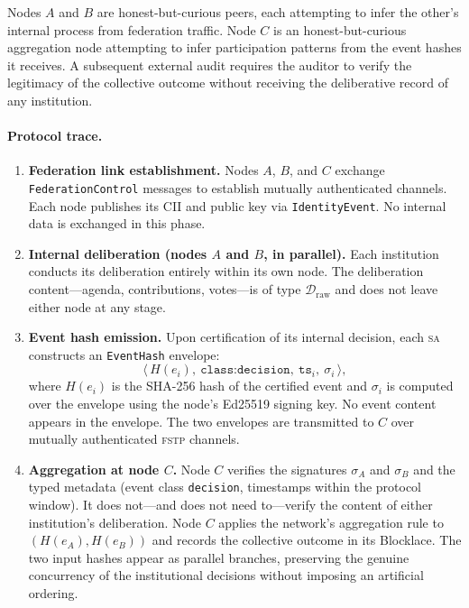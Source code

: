 \documentclass[12pt]{article}
\newcommand{\Draw}{\mathcal{D}_{\text{raw}}}
\newcommand{\SA}{\textsc{sa}}
\newcommand{\FSTP}{\textsc{fstp}}
\begin{document}
	Nodes $A$ and $B$ are honest-but-curious peers, each attempting to
	infer the other's internal process from federation traffic. Node $C$
	is an honest-but-curious aggregation node attempting to infer
	participation patterns from the event hashes it receives. A subsequent
	external audit requires the auditor to verify the legitimacy of the
	collective outcome without receiving the deliberative record of any
	institution.
	
	\paragraph{Protocol trace.}
	
	\begin{enumerate}[itemsep=3pt,topsep=4pt]
		
		\item \textbf{Federation link establishment.} Nodes $A$, $B$, and
		$C$ exchange \texttt{FederationControl} messages to establish
		mutually authenticated channels. Each node publishes its CII and
		public key via \texttt{IdentityEvent}. No internal data is
		exchanged in this phase.
		
		\item \textbf{Internal deliberation (nodes $A$ and $B$, in parallel).}
		Each institution conducts its deliberation entirely within its own
		node. The deliberation content---agenda, contributions, votes---is
		of type $\Draw$ and does not leave either node at any stage.
		
		\item \textbf{Event hash emission.} Upon certification of its
		internal decision, each \SA{} constructs an \texttt{EventHash}
		envelope:
		\[
		\langle\, H(e_i),\ \texttt{class:decision},\
		\texttt{ts}_i,\ \sigma_i \,\rangle,
		\]
		where $H(e_i)$ is the SHA-256 hash of the certified event and
		$\sigma_i$ is computed over the envelope using the node's Ed25519
		signing key. No event content appears in the envelope. The two
		envelopes are transmitted to $C$ over mutually authenticated
		\FSTP{} channels.
		
		\item \textbf{Aggregation at node $C$.} Node $C$ verifies the
		signatures $\sigma_A$ and $\sigma_B$ and the typed metadata (event
		class \texttt{decision}, timestamps within the protocol window). It
		does not---and does not need to---verify the content of either
		institution's deliberation. Node $C$ applies the network's
		aggregation rule to $(H(e_A), H(e_B))$ and records the collective
		outcome in its Blocklace. The two input hashes appear as parallel
		branches, preserving the genuine concurrency of the institutional
		decisions without imposing an artificial ordering.
		

\end{enumerate}
\end{document}

